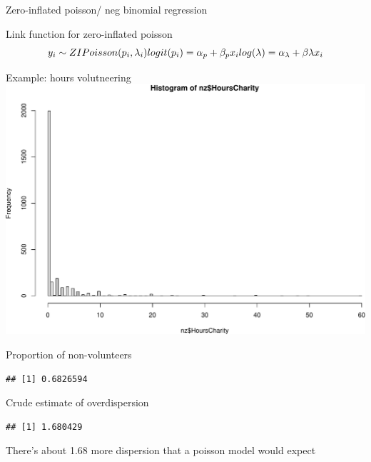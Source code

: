 \documentclass[
  ignorenonframetext,
]{beamer}
\begin{document}
\begin{frame}[fragile]{Zero-inflated poisson/ neg binomial regression}
\protect\hypertarget{zero-inflated-poisson-neg-binomial-regression}{}
\begin{block}{Link function for zero-inflated poisson}
\protect\hypertarget{link-function-for-zero-inflated-poisson}{}
\[
y_i \sim ZIPoisson(p_i, \lambda_i)\\
logit(p_i) = \alpha_p + \beta_p x_i \\
log(\lambda) = \alpha_\lambda + \beta\lambda x_i
\]
\end{block}

\begin{block}{Example: hours volutneering}
\protect\hypertarget{example-hours-volutneering}{}
\includegraphics{slides_files/figure-beamer/unnamed-chunk-46-1.pdf}
\end{block}

\begin{block}{Proportion of non-volunteers}
\protect\hypertarget{proportion-of-non-volunteers}{}
\begin{verbatim}
## [1] 0.6826594
\end{verbatim}
\end{block}

\begin{block}{Crude estimate of overdispersion}
\protect\hypertarget{crude-estimate-of-overdispersion}{}
\begin{verbatim}
## [1] 1.680429
\end{verbatim}

There's about 1.68 more dispersion that a poisson model would expect
\end{block}


\end{frame}
\end{document}
